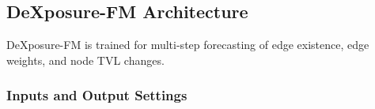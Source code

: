 %

\subsection{DeXposure-FM Architecture}
\label{sec:dexposure-fm-architecture}

DeXposure-FM is trained for multi-step forecasting of edge existence, edge weights, and node TVL changes. %

\subsubsection{Inputs and Output Settings}

